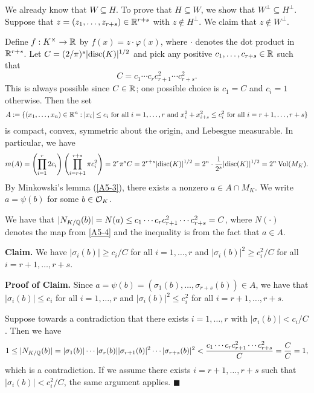 \begin{pf}
    We already know that $W \subseteq H$. To prove that $H \subseteq W$, we show that 
    $W^\perp \subseteq H^\perp$. Suppose that $z = (z_1, \dots, z_{r+s}) \in \mathbb{R}^{r+s}$ 
    with $z \notin H^\perp$. We claim that $z \notin W^\perp$. 

    Define $f : K^\times \to \mathbb{R}$ by $f(x) = z \cdot \varphi(x)$, where $\cdot$ 
    denotes the dot product in $\mathbb{R}^{r+s}$. Let $C = (2/\pi)^s \lvert\operatorname{disc}(K)\rvert^{1/2}$ 
    and pick any positive $c_1, \dots, c_{r+s} \in \mathbb{R}$ such that 
    \[ C = c_1 \cdots c_r c_{r+1}^2 \cdots c_{r+s}^2. \] 
    This is always possible since $C \in \mathbb{R}$; one possible choice is $c_1 = C$ and 
    $c_i = 1$ otherwise. 
    Then the set 
    \[ A := \{(x_1, \dots, x_n) \in \mathbb{R}^n : |x_i| \leq c_i \text{ for all $i = 1, \dots, r$ 
    and $x_i^2 + x_{i+s}^2 \leq c_i^2$ for all $i = r+1, \dots, r+s$}\} \] 
    is compact, convex, symmetric about the origin, and Lebesgue measurable. In particular, 
    we have
    \[ m(A) = \left( \prod_{i=1}^r 2c_i \right) \left( \prod_{i=r+1}^{r+s} \pi c_i^2 \right) 
    = 2^r \pi^s C = 2^{r+s} \lvert\operatorname{disc}(K)\rvert^{1/2} = 2^n \cdot \frac1{2^s}\lvert\operatorname{disc}(K)\rvert^{1/2}
    = 2^n \operatorname{Vol}(M_K). \] 
    By Minkowski's lemma (\ref{A5-3}), there exists a nonzero $a \in A \cap M_K$. We write 
    $a = \psi(b)$ for some $b \in {\cal O}_K$. 

    We have that $|N_{K/\mathbb{Q}}(b)| = N(a) \leq c_1 \cdots c_r c_{r+1}^2 
    \cdots c_{r+s}^2 = C$, where $N(\cdot)$ denotes the map from \ref{A5-4} and 
    the inequality is from the fact that $a \in A$.

    {\bf Claim.} We have $|\sigma_i(b)| \geq c_i/C$ for all $i = 1, \dots, r$
    and $|\sigma_i(b)|^2 \geq c_i^2/C$ for all $i = r+1, \dots, r+s$.

    {\bf Proof of Claim.} Since $a = \psi(b) = (\sigma_1(b), \dots, \sigma_{r+s}(b)) \in A$, 
    we have that $|\sigma_i(b)| \leq c_i$ for all $i = 1, \dots, r$ and 
    $|\sigma_i(b)|^2 \leq c_i^2$ for all $i = r+1, \dots, r+s$. 

    Suppose towards a contradiction that there exists $i = 1, \dots, r$ with 
    $|\sigma_i(b)| < c_i/C$. Then we have 
    \[ 1 \leq |N_{K/\mathbb{Q}}(b)| = |\sigma_1(b)| \cdots |\sigma_r(b)| |\sigma_{r+1}(b)|^2 
    \cdots |\sigma_{r+s}(b)|^2 < \frac{c_1 \cdots c_r c_{r+1}^2 \cdots c_{r+s}^2}{C} 
    = \frac{C}{C} = 1, \] 
    which is a contradiction. If we assume there exists $i = r+1, \dots, r+s$ 
    such that $|\sigma_i(b)| < c_i^2/C$, the same argument applies. \hfill $\blacksquare$ 


\end{pf}
